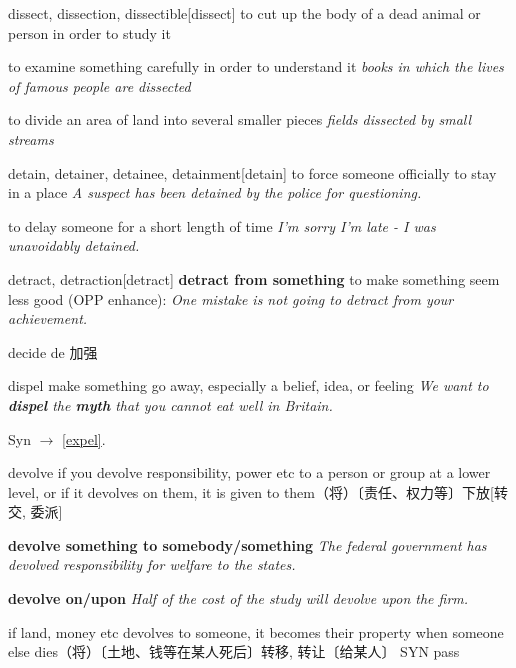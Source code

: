 \begin{DefWord}{dissect, dissection, dissectible}[dissect]
    to cut up the body of a dead animal or person in order to study it

    to examine something carefully in order to understand it
    \textit{books in which the lives of famous people are dissected}

    to divide an area of land into several smaller pieces
    \textit{fields dissected by small streams}
\end{DefWord}

\begin{DefWord}{detain, detainer, detainee, detainment}[detain]
    to force someone officially to stay in a place
    \textit{A suspect has been detained by the police for questioning.}

    to delay someone for a short length of time
\textit{I'm sorry I'm late - I was unavoidably detained.}
\end{DefWord}

\begin{DefWord}{detract, detraction}[detract]
    \textbf{detract from something}
    to make something seem less good (OPP  enhance):
    \textit{One mistake is not going to detract from your achievement.}
\end{DefWord}

\begin{DefWord}{decide}
    de 加强
\end{DefWord}

\begin{DefWord}{dispel}
    make something go away, especially a belief, idea, or feeling
    \textit{We want to \textbf{dispel} the \textbf{myth} that you cannot eat well in Britain.}

    Syn $\rightarrow$ \ref{expel}.
\end{DefWord}

\begin{DefWord}{devolve}
    if you devolve responsibility, power etc to a person or group at a lower level, or if it devolves on them, it is given to them（将）〔责任、权力等〕下放[转交, 委派]

    \textbf{devolve something to somebody/something}
    \textit{The federal government has devolved responsibility for welfare to the states.}

    \textbf{devolve on/upon}
    \textit{Half of the cost of the study will devolve upon the firm.}

    if land, money etc devolves to someone, it becomes their property when someone else dies（将）〔土地、钱等在某人死后〕转移, 转让〔给某人〕 SYN  pass
\end{DefWord}

